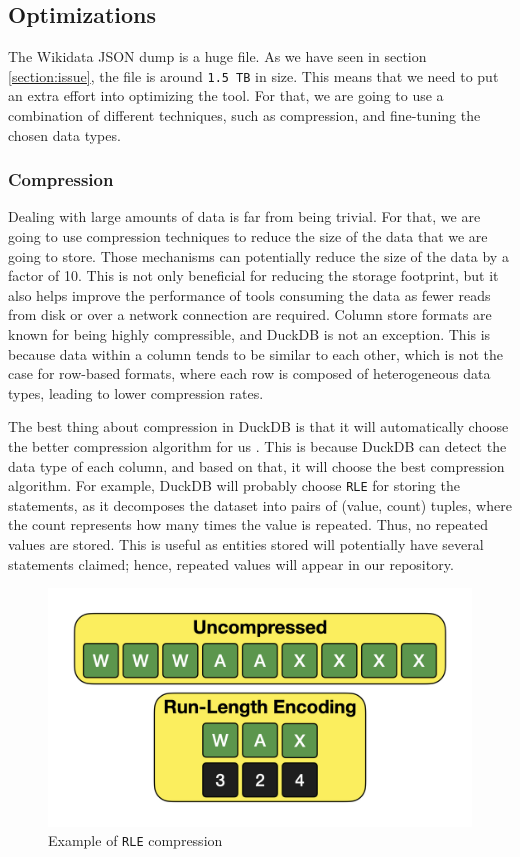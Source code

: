 \subsection{Optimizations}

The Wikidata JSON dump is a huge file. As we have seen in section \ref{section:issue}, the file is around \texttt{1.5 TB} in size. This means that we need to put an extra effort into optimizing the tool. For that, we are going to use a combination of different techniques, such as compression, and fine-tuning the chosen data types.

\subsubsection{Compression}

Dealing with large amounts of data is far from being trivial. For that, we are going to use compression techniques to reduce the size of the data that we are going to store. Those mechanisms can potentially reduce the size of the data by a factor of 10. This is not only beneficial for reducing the storage footprint, but it also helps improve the performance of tools consuming the data as fewer reads from disk or over a network connection are required. Column store formats are known for being highly compressible, and DuckDB is not an exception. This is because data within a column tends to be similar to each other, which is not the case for row-based formats, where each row is composed of heterogeneous data types, leading to lower compression rates.

The best thing about compression in DuckDB is that it will automatically choose the better compression algorithm for us \cite{Raasveldt_2022}. This is because DuckDB can detect the data type of each column, and based on that, it will choose the best compression algorithm. For example, DuckDB will probably choose \texttt{RLE} for storing the statements, as it decomposes the dataset into pairs of (value, count) tuples, where the count represents how many times the value is repeated. Thus, no repeated values are stored. This is useful as entities stored will potentially have several statements claimed; hence, repeated values will appear in our repository.

\begin{figure}[ht]
    \centering
    \includegraphics[width=.8\linewidth]{figures/diagrams/10-2_rle.png}
    \caption[Example of \texttt{RLE} compression]{Example of \texttt{RLE} compression \cite{Raasveldt_2022}}
\end{figure}

